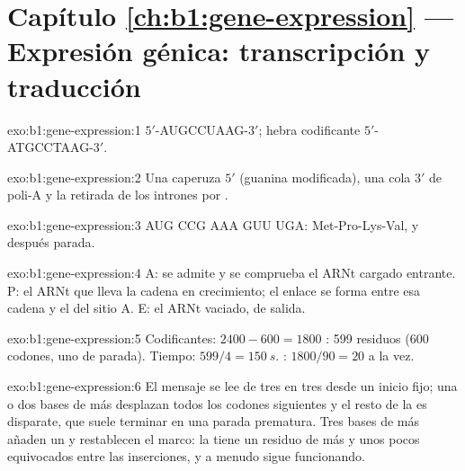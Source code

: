 \section*{Capítulo \ref{ch:b1:gene-expression} --- Expresión génica: transcripción y traducción}

\begin{solution}{exo:b1:gene-expression:1}
 $5'$-AUGCCUAAG-$3'$; hebra codificante $5'$-ATGCCTAAG-$3'$.
\end{solution}

\begin{solution}{exo:b1:gene-expression:2}
Una caperuza $5'$ (guanina modificada), una cola $3'$ de poli-A y la
retirada de los intrones por .
\end{solution}

\begin{solution}{exo:b1:gene-expression:3}
AUG CCG AAA GUU UGA: Met-Pro-Lys-Val, y después parada.
\end{solution}

\begin{solution}{exo:b1:gene-expression:4}
A: se admite y se comprueba el ARNt cargado entrante. P: el ARNt que lleva
la cadena en crecimiento; el enlace se forma entre esa cadena y el
 del sitio A. E: el ARNt vaciado, de salida.
\end{solution}

\begin{solution}{exo:b1:gene-expression:5}
Codificantes: $2400 - 600 = 1800$ : 599 residuos (600 codones,
uno de parada). Tiempo: $599/4 = \qty{150}{s}$. : $1800/90 = 20$ a
la vez.
\end{solution}

\begin{solution}{exo:b1:gene-expression:6}
El mensaje se lee de tres en tres desde un inicio fijo; una o dos bases de
más desplazan todos los codones siguientes y el resto de la  es
disparate, que suele terminar en una parada prematura. Tres bases de más
añaden un  y restablecen el marco: la  tiene un residuo de más
y unos pocos equivocados entre las inserciones, y a menudo sigue
funcionando.
\end{solution}


